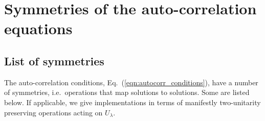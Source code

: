 \documentclass[aps,nofootinbib,floatfix,a4paper]{revtex4}
\newcommand{\1}{\mbox{$\mathbf{1}$}}
\begin{document}
\section{Symmetries of the auto-correlation equations}
\label{sec:symmetries}

\subsection{List of symmetries}
\label{sec:list_of_symmetries}

The auto-correlation conditions, Eq.~(\ref{eqn:autocorr_conditions}), have a number of symmetries, i.e.\ operations that map solutions to solutions.
Some are listed below. 
If applicable, we give implementations in terms of manifestly two-unitarity preserving operations acting on  $U_\lambda$.

\end{document}
